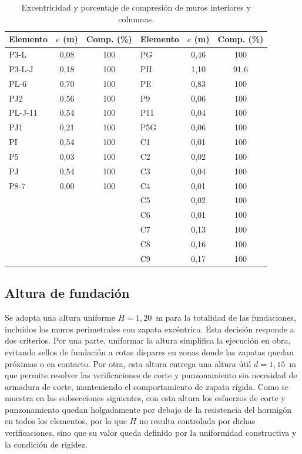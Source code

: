 \begin{table}[H]
\centering
\footnotesize
\caption{Excentricidad y porcentaje de compresión de muros interiores y columnas.}
\label{tab:comp}
\begin{tabular}{lcc|lcc}
\hline
Elemento & $e$ (m) & Comp. (\%) & Elemento & $e$ (m) & Comp. (\%) \\
\hline
P3-L    & 0,08 & 100  & PG   & 0,46 & 100  \\
P3-L-J  & 0,18 & 100  & PH   & 1,10 & 91,6 \\
PL-6    & 0,70 & 100  & PE   & 0,83 & 100  \\
PJ2     & 0,56 & 100  & P9   & 0,06 & 100  \\
PL-J-11 & 0,54 & 100  & P11  & 0,04 & 100  \\
PJ1     & 0,21 & 100  & P5G  & 0,06 & 100  \\
PI      & 0,54 & 100  & C1   & 0,01 & 100  \\
P5      & 0,03 & 100  & C2   & 0,02 & 100  \\
PJ      & 0,54 & 100  & C3   & 0,04 & 100  \\
P8-7    & 0,00 & 100  & C4   & 0,01 & 100  \\
        &      &      & C5   & 0,02 & 100  \\
        &      &      & C6   & 0,01 & 100  \\
        &      &      & C7   & 0,13 & 100  \\
        &      &      & C8   & 0,16 & 100  \\
        &      &      & C9   & 0,17 & 100  \\
\hline
\end{tabular}
\end{table}

\subsection{Altura de fundación}
Se adopta una altura uniforme $H = 1,20$~m para la totalidad de las fundaciones, incluidos los muros perimetrales con zapata excéntrica. Esta decisión responde a dos criterios. Por una parte, uniformar la altura simplifica la ejecución en obra, evitando sellos de fundación a cotas dispares en zonas donde las zapatas quedan próximas o en contacto. Por otra, esta altura entrega una altura útil $d = 1,15$~m que permite resolver las verificaciones de corte y punzonamiento sin necesidad de armadura de corte, manteniendo el comportamiento de zapata rígida. Como se muestra en las subsecciones siguientes, con esta altura los esfuerzos de corte y punzonamiento quedan holgadamente por debajo de la resistencia del hormigón en todos los elementos, por lo que $H$ no resulta controlada por dichas verificaciones, sino que su valor queda definido por la uniformidad constructiva y la condición de rigidez.

